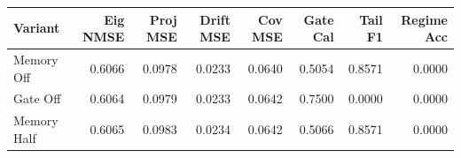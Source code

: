 \begin{tabular}{lrrrrrrr}
\toprule
Variant & Eig NMSE & Proj MSE & Drift MSE & Cov MSE & Gate Cal & Tail F1 & Regime Acc \\
\midrule
Memory Off & 0.6066 & 0.0978 & 0.0233 & 0.0640 & 0.5054 & 0.8571 & 0.0000 \\
Gate Off & 0.6064 & 0.0979 & 0.0233 & 0.0642 & 0.7500 & 0.0000 & 0.0000 \\
Memory Half & 0.6065 & 0.0983 & 0.0234 & 0.0642 & 0.5066 & 0.8571 & 0.0000 \\
\bottomrule
\end{tabular}